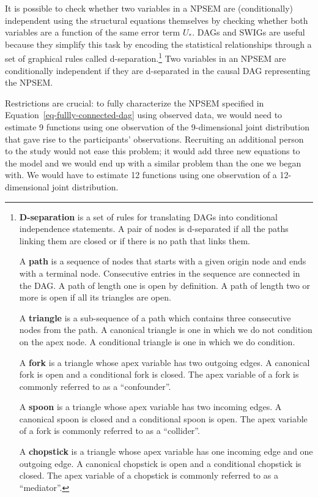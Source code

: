 \documentclass[
  letterpaper,
  DIV=11,
  numbers=noendperiod,
  oneside]{scrreprt}
\begin{document}
It is possible to check whether two variables in a NPSEM are
(conditionally) independent using the structural equations themselves by
checking whether both variables are a function of the same error term
\(U_*\). DAGs and SWIGs are useful because they simplify this task by
encoding the statistical relationships through a set of graphical rules
called d-separation.\footnote{\textbf{D-separation} is a set of rules
  for translating DAGs into conditional independence statements. A pair
  of nodes is d-separated if all the paths linking them are closed or if
  there is no path that links them.

  A \textbf{path} is a sequence of nodes that starts with a given origin
  node and ends with a terminal node. Consecutive entries in the
  sequence are connected in the DAG. A path of length one is open by
  definition. A path of length two or more is open if all its triangles
  are open.

  A \textbf{triangle} is a sub-sequence of a path which contains three
  consecutive nodes from the path. A canonical triangle is one in which
  we do not condition on the apex node. A conditional triangle is one in
  which we do condition.

  A \textbf{fork} is a triangle whose apex variable has two outgoing
  edges. A canonical fork is open and a conditional fork is closed. The
  apex variable of a fork is commonly referred to as a ``confounder''.

  A \textbf{spoon} is a triangle whose apex variable has two incoming
  edges. A canonical spoon is closed and a conditional spoon is open.
  The apex variable of a fork is commonly referred to as a ``collider''.

  A \textbf{chopstick} is a triangle whose apex variable has one
  incoming edge and one outgoing edge. A canonical chopstick is open and
  a conditional chopstick is closed. The apex variable of a chopstick is
  commonly referred to as a ``mediator''.} Two variables in an NPSEM are
conditionally independent if they are d-separated in the causal DAG
representing the NPSEM.

Restrictions are crucial: to fully characterize the NPSEM specified in
Equation~\ref{eq-fullly-connected-dag} using observed data, we would
need to estimate 9 functions using one observation of the 9-dimensional
joint distribution that gave rise to the participants' observations.
Recruiting an additional person to the study would not ease this
problem; it would add three new equations to the model and we would end
up with a similar problem than the one we began with. We would have to
estimate 12 functions using one observation of a 12-dimensional joint
distribution.
\end{document}
